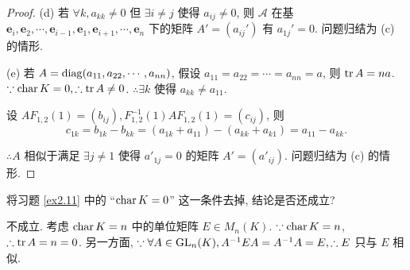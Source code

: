 \documentclass{ctexart}
\begin{document}
\begin{proof}
    (d) 若 $\forall k,a_{kk}\neq0$ 但 $\exists i\neq j$ 使得 $a_{ij}\neq0$, 则 $\mathcal{A}$ 在基 $\boldsymbol{e}_i,\boldsymbol{e}_2,\cdots,\boldsymbol{e}_{i-1},\boldsymbol{e}_1,\boldsymbol{e}_{i+1},\cdots,\boldsymbol{e}_n$ 下的矩阵 $A'=(a_{ij}')$ 有 $a_{1j}'=0$. 问题归结为 (c) 的情形.

    (e) 若 $A=\operatorname{diag} (a_{11},a_{22},\cdots,a_{nn})$, 假设 $a_{11}=a_{22}=\cdots=a_{nn}=a$, 则 $\operatorname{tr} A=na$. $\because\operatorname{char} K=0,\therefore\operatorname{tr} A\neq0$. $\therefore\exists k$ 使得 $a_{kk}\neq a_{11}$.

    设 $AF_{1,2}(1)=(b_{ij}),F^{-1}_{1,2}(1)AF_{1,2}(1)=(c_{ij})$, 则
    \[c_{1k}=b_{1k}-b_{kk}=(a_{1k}+a_{11})-(a_{kk}+a_{k1})=a_{11}-a_{kk}.\]
    
    $\therefore A$ 相似于满足 $\exists j\neq 1$ 使得 $a'_{1j}=0$ 的矩阵 $A'=(a'_{ij})$. 问题归结为 (c) 的情形.
\end{proof}
\begin{exercise}%
    将习题 \ref{ex2.11} 中的 ``$\operatorname{char} K=0$'' 这一条件去掉, 结论是否还成立?
\end{exercise}
\begin{solution}
    不成立. 考虑 $\operatorname{char} K=n$ 中的单位矩阵 $E\in M_n(K)$. $\because\operatorname{char} K=n$, $\therefore\operatorname{tr} A=n=0$. 另一方面, $\because\forall A\in\operatorname{GL} _n(K),A^{-1}EA=A^{-1}A=E,\therefore E$ 只与 $E$ 相似.
\end{solution}
\end{document}
